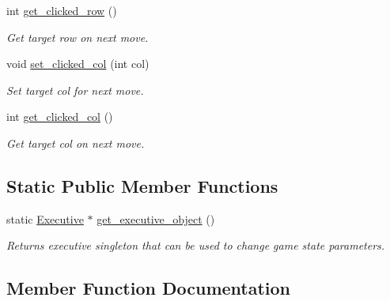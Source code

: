 \begin{DoxyCompactItemize}
int \mbox{\hyperlink{classExecutive_a2e5f0cb131520db0229bbe5084cef3bc}{get\+\_\+clicked\+\_\+row}} ()
\begin{DoxyCompactList}\small\item\em Get target row on next move. \end{DoxyCompactList}\item 
\mbox{\label{classExecutive_a2adde84f5a86ae30f955b9be8da29751}} 
void \mbox{\hyperlink{classExecutive_a2adde84f5a86ae30f955b9be8da29751}{set\+\_\+clicked\+\_\+col}} (int col)
\begin{DoxyCompactList}\small\item\em Set target col for next move. \end{DoxyCompactList}\item 
\mbox{\label{classExecutive_a3acf16d74de6856fd5254564cc914f34}} 
int \mbox{\hyperlink{classExecutive_a3acf16d74de6856fd5254564cc914f34}{get\+\_\+clicked\+\_\+col}} ()
\begin{DoxyCompactList}\small\item\em Get target col on next move. \end{DoxyCompactList}\end{DoxyCompactItemize}
\subsection*{Static Public Member Functions}
\begin{DoxyCompactItemize}
\item 
\mbox{\label{classExecutive_abd86af2454e1c72a9c5eeb047eed7a8d}} 
static \mbox{\hyperlink{classExecutive}{Executive}} $\ast$ \mbox{\hyperlink{classExecutive_abd86af2454e1c72a9c5eeb047eed7a8d}{get\+\_\+executive\+\_\+object}} ()
\begin{DoxyCompactList}\small\item\em Returns executive singleton that can be used to change game state parameters. \end{DoxyCompactList}\end{DoxyCompactItemize}


\subsection{Member Function Documentation}
\mbox{\label{classExecutive_aa18c7d0914c7332188968681132809d0}} 
